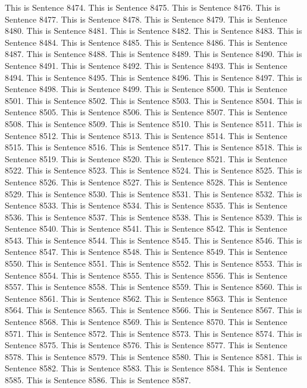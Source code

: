 \documentclass{article}
\begin{document}
This is Sentence 8474.
This is Sentence 8475.
This is Sentence 8476.
This is Sentence 8477.
This is Sentence 8478.
This is Sentence 8479.
This is Sentence 8480.
This is Sentence 8481.
This is Sentence 8482.
This is Sentence 8483.
This is Sentence 8484.
This is Sentence 8485.
This is Sentence 8486.
This is Sentence 8487.
This is Sentence 8488.
This is Sentence 8489.
This is Sentence 8490.
This is Sentence 8491.
This is Sentence 8492.
This is Sentence 8493.
This is Sentence 8494.
This is Sentence 8495.
This is Sentence 8496.
This is Sentence 8497.
This is Sentence 8498.
This is Sentence 8499.
This is Sentence 8500.
This is Sentence 8501.
This is Sentence 8502.
This is Sentence 8503.
This is Sentence 8504.
This is Sentence 8505.
This is Sentence 8506.
This is Sentence 8507.
This is Sentence 8508.
This is Sentence 8509.
This is Sentence 8510.
This is Sentence 8511.
This is Sentence 8512.
This is Sentence 8513.
This is Sentence 8514.
This is Sentence 8515.
This is Sentence 8516.
This is Sentence 8517.
This is Sentence 8518.
This is Sentence 8519.
This is Sentence 8520.
This is Sentence 8521.
This is Sentence 8522.
This is Sentence 8523.
This is Sentence 8524.
This is Sentence 8525.
This is Sentence 8526.
This is Sentence 8527.
This is Sentence 8528.
This is Sentence 8529.
This is Sentence 8530.
This is Sentence 8531.
This is Sentence 8532.
This is Sentence 8533.
This is Sentence 8534.
This is Sentence 8535.
This is Sentence 8536.
This is Sentence 8537.
This is Sentence 8538.
This is Sentence 8539.
This is Sentence 8540.
This is Sentence 8541.
This is Sentence 8542.
This is Sentence 8543.
This is Sentence 8544.
This is Sentence 8545.
This is Sentence 8546.
This is Sentence 8547.
This is Sentence 8548.
This is Sentence 8549.
This is Sentence 8550.
This is Sentence 8551.
This is Sentence 8552.
This is Sentence 8553.
This is Sentence 8554.
This is Sentence 8555.
This is Sentence 8556.
This is Sentence 8557.
This is Sentence 8558.
This is Sentence 8559.
This is Sentence 8560.
This is Sentence 8561.
This is Sentence 8562.
This is Sentence 8563.
This is Sentence 8564.
This is Sentence 8565.
This is Sentence 8566.
This is Sentence 8567.
This is Sentence 8568.
This is Sentence 8569.
This is Sentence 8570.
This is Sentence 8571.
This is Sentence 8572.
This is Sentence 8573.
This is Sentence 8574.
This is Sentence 8575.
This is Sentence 8576.
This is Sentence 8577.
This is Sentence 8578.
This is Sentence 8579.
This is Sentence 8580.
This is Sentence 8581.
This is Sentence 8582.
This is Sentence 8583.
This is Sentence 8584.
This is Sentence 8585.
This is Sentence 8586.
This is Sentence 8587.
\end{document}
